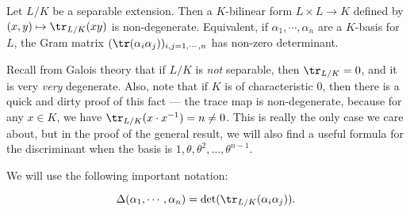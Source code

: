 \documentclass[a4paper]{article}
\begin{document}
\begin{prop}
  Let $L/K$ be a separable extension. Then a $K$-bilinear form $L \times L \to K$ defined by $(x, y) \mapsto \tr_{L/K}(xy)$ is non-degenerate. Equivalent, if $\alpha_1,\cdots, \alpha_n$ are a $K$-basis for $L$, the Gram matrix $(\tr(\alpha_i\alpha_j))_{i, j = 1, \cdots, n}$ has non-zero determinant.
\end{prop}
Recall from Galois theory that if $L/K$ is \emph{not} separable, then $\tr_{L/K} = 0$, and it is very \emph{very} degenerate. Also, note that if $K$ is of characteristic $0$, then there is a quick and dirty proof of this fact --- the trace map is non-degenerate, because for any $x \in K$, we have $\tr_{L/K}(x\cdot x^{-1}) = n \not= 0$. This is really the only case we care about, but in the proof of the general result, we will also find a useful formula for the discriminant when the basis is $1, \theta, \theta^2, \ldots, \theta^{n - 1}$.

We will use the following important notation:
\begin{notation}
  \[
    \Delta(\alpha_1, \cdots, \alpha_n) = \det(\tr_{L/K}(\alpha_i \alpha_j)).
  \]
\end{notation}
\end{document}
